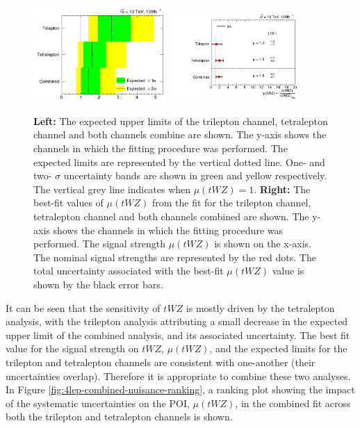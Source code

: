 \begin{figure}[h!]
    \centering
    \includegraphics[width=0.45\textwidth]{figures/combined/Limits.png}
     \includegraphics[width=0.45\textwidth]{figures/combined/POI_SigXsecOverSM_.png}
    \caption{\textbf{Left: }The expected upper limits of the trilepton channel, tetralepton channel and both channels combine are shown. The y-axis shows the channels in which the fitting procedure was performed. The expected limits are represented by the vertical dotted line. One- and two- $\sigma$ uncertainty bands are shown in green and yellow respectively. The vertical grey line indicates when $\mu (tWZ) = 1$. \textbf{Right: }The best-fit values of $\mu (tWZ)$ from the fit for the trilepton channel, tetralepton channel and both channels combined are shown. The y-axis shows the channels in which the fitting procedure was performed. The signal strength $\mu (tWZ)$ is shown on the x-axis. The nominal signal strengths are represented by the red dots. The total uncertainty associated with the best-fit $\mu (tWZ)$ value is shown by the black error bars.}
    \label{fig:combinedlimits}
\end{figure}It can be seen that the sensitivity of $tWZ$ is mostly driven by the tetralepton analysis, with the trilepton analysis attributing a small decrease in the expected upper limit of the combined analysis, and its associated uncertainty. The best fit value for the signal strength on $tWZ$, $\mu (tWZ)$, and the expected limits for the trilepton and tetralepton channels are consistent with one-another (their uncertainties overlap). Therefore it is appropriate to combine these two analyses. In Figure \ref{fig:4lep-combined-nuisance-ranking}, a ranking plot showing the impact of the systematic uncertainties on the POI, $\mu (tWZ)$, in the combined fit across both the trilepton and tetralepton channels is shown.
